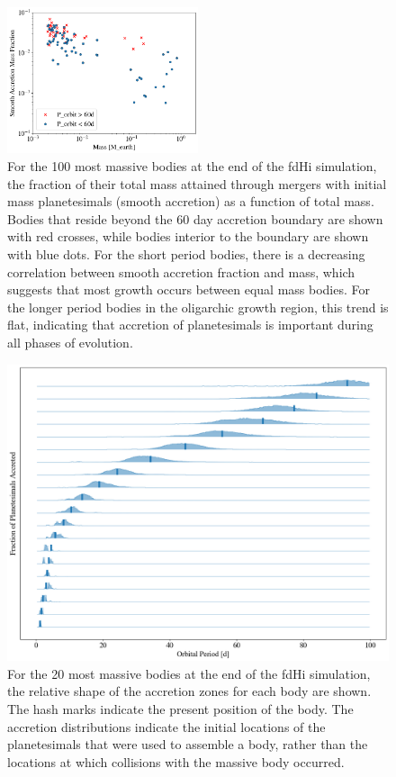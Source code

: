 \documentclass[twocolumn]{aastex63}
\begin{document}
\begin{figure}
\begin{center}
    \includegraphics[width=0.5\textwidth]{figures/minor_frac.png}
    \caption{For the 100 most massive bodies at the end of the fdHi simulation, the fraction of their total mass attained through mergers with initial mass planetesimals (smooth accretion) as a function of total mass. Bodies that reside beyond the 60 day accretion boundary are shown with red crosses, while bodies interior to the boundary are shown with blue dots. For the short period bodies, there is a decreasing correlation between smooth accretion fraction and mass, which suggests that most growth occurs between equal mass bodies. For the longer period bodies in the oligarchic growth region, this trend is flat, indicating that accretion of planetesimals is important during all phases of evolution.\label{fig:minor_frac}}
\end{center}
\end{figure}

\begin{figure}
\begin{center}
    \includegraphics[width=\textwidth]{figures/acc_zones.png}
    \caption{For the 20 most massive bodies at the end of the fdHi simulation, the relative shape of the accretion zones for each body are shown. The hash marks indicate the present position of the body. The accretion distributions indicate the initial locations of the planetesimals that were used to assemble a body, rather than the locations at which collisions with the massive body occurred.\label{fig:acc_zones}}
\end{center}
\end{figure}
\end{document}
